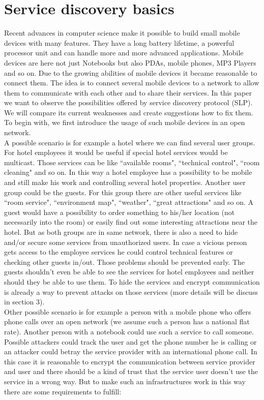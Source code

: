 \section{Service discovery basics}
Recent advances in computer science make it possible to build small mobile devices with many features. They have a long battery lifetime, a powerful processor unit and can handle more and more advanced applications. Mobile devices are here not just Notebooks but also PDAs, mobile phones, MP3 Players and so on. Due to the growing abilities of mobile devices it became reasonable to connect them. The idea is to connect several mobile devices to a network to allow them to communicate with each other and to share their services. In this paper we want to observe the possibilities offered by service discovery protocol (SLP). We will compare its current weaknesses and create suggestions how to fix them. To begin with, we first introduce the usage of such mobile devices in an open network.\\
A possible scenario is for example a hotel where we can find several user groups. For hotel employees it would be useful if special hotel services would be multicast. Those services can be like ``available rooms", ``technical control", ``room cleaning" and so on. In this way a hotel employee has a possibility to be mobile and still make his work and controlling several hotel properties. Another user group could be the guests. For this group there are other useful services like ``room service", ``environment map", ``weather", ``great attractions" and so on. A guest would have a possibility to order something to his/her location (not necessarily into the room) or easily find out some interesting attractions near the hotel. But as both groups are in same network, there is also a need to hide and/or secure some services from unauthorized users. In case a vicious person gets access to the employee services he could control technical features or checking other guests in/out. Those problems should be prevented early. The guests shouldn't even be able to see the services for hotel employees and neither should they be able to use them. To hide the services and encrypt communication is already a way to prevent attacks on those services (more details will be discuss in section 3).\\
Other possible scenario is for example a person with a mobile phone who offers phone calls over an open network (we assume such a person has a national flat rate). Another person with a notebook could use such a service to call someone. Possible attackers could track the user and get the phone number he is calling or an attacker could betray the service provider with an international phone call. In this case it is reasonable to encrypt the communication between service provider and user and there should be a kind of trust that the service user doesn't use the service in a wrong way. But to make such an infrastructures work in this way there are some requirements to fulfill: 
